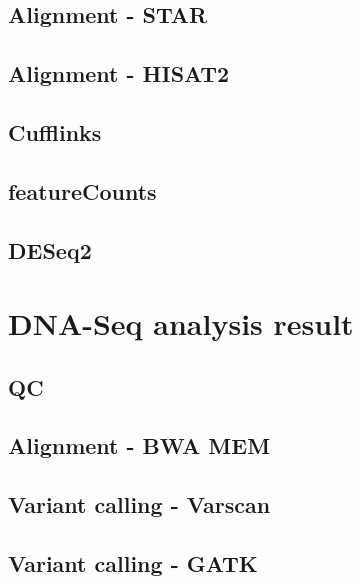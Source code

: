 \subsection{Alignment - STAR}

\subsection{Alignment - HISAT2}

\subsection{Cufflinks}

\subsection{featureCounts}

\subsection{DESeq2}


\section{DNA-Seq analysis result}

\subsection{QC}

\subsection{Alignment - BWA MEM}

\subsection{Variant calling - Varscan}

\subsection{Variant calling - GATK}


